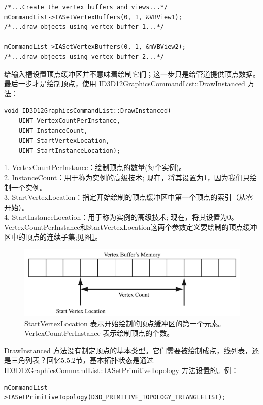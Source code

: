 \documentclass[11pt,a4paper,oldfontcommands]{memoir}
\begin{document}
{\begin{flushleft}
\begin{lstlisting}
/*...Create the vertex buffers and views...*/
mCommandList->IASetVertexBuffers(0, 1, &VBView1);
/*...draw objects using vertex buffer 1...*/

mCommandList->IASetVertexBuffers(0, 1, &mVBView2);
/*...draw objects using vertex buffer 2...*/
\end{lstlisting}
给输入槽设置顶点缓冲区并不意味着绘制它们；这一步只是给管道提供顶点数据。最后一步才是绘制顶点，使用 ID3D12GraphicsCommandList::DrawInstanced 方法：\\
\begin{lstlisting}
void ID3D12GraphicsCommandList::DrawInstanced(
    UINT VertexCountPerInstance,
    UINT InstanceCount,
    UINT StartVertexLocation,
    UINT StartInstanceLocation);
\end{lstlisting}
1. VertexCountPerInstance：绘制顶点的数量(每个实例)。\\
2. InstanceCount：用于称为实例的高级技术; 现在，将其设置为1，因为我们只绘制一个实例。\\
3. StartVertexLocation：指定开始绘制的顶点缓冲区中第一个顶点的索引（从零开始）。\\
4. StartInstanceLocation：用于称为实例的高级技术; 现在，将其设置为0。\\
VertexCountPerInstance和StartVertexLocation这两个参数定义要绘制的顶点缓冲区中的顶点的连续子集;见图\ref{fig:6-2}。\\
\begin{figure}[h]
    \includegraphics[width=\textwidth]{6-2}
    \centering
    \caption{StartVertexLocation 表示开始绘制的顶点缓冲区的第一个元素。VertexCountPerInstance 表示绘制顶点的个数。}
    \label{fig:6-2}
\end{figure}

DrawInstanced 方法没有制定顶点的基本类型。它们需要被绘制成点，线列表，还是三角列表？回忆5.5.2节，基本拓扑状态是通过 ID3D12GraphicsCommandList::IASetPrimitiveTopology 方法设置的。例：\\
\begin{lstlisting}
mCommandList->IASetPrimitiveTopology(D3D_PRIMITIVE_TOPOLOGY_TRIANGLELIST);
\end{lstlisting}
\end{flushleft}
}
\end{document}
